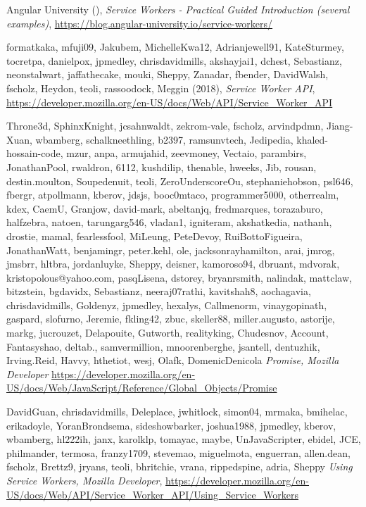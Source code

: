 \documentclass[11pt ,a4paper , twoside , openright ]{article}
\begin{document}
\begin{thebibliography}{99}
	\bibitem{}
	Angular University (),
	\emph{Service Workers - Practical Guided Introduction (several examples)},
	\url{https://blog.angular-university.io/service-workers/}
	
	\bibitem{}
	formatkaka, mfuji09, Jakubem, MichelleKwa12, Adrianjewell91, KateSturmey, tocretpa, danielpox, jpmedley, chrisdavidmills, akshayjai1, dchest, Sebastianz, neonstalwart, jaffathecake, mouki, Sheppy, Zanadar, fbender, DavidWalsh, fscholz, Heydon, teoli, rassoodock, Meggin (2018),
	\emph{Service Worker API},
	\url{https://developer.mozilla.org/en-US/docs/Web/API/Service_Worker_API}
	
	\bibitem{}
	Throne3d, SphinxKnight, jcsahnwaldt, zekrom-vale, fscholz, arvindpdmn, Jiang-Xuan, wbamberg, schalkneethling, b2397, ramsunvtech, Jedipedia, khaled-hossain-code, mzur, anpa, armujahid, zeevmoney, Vectaio, parambirs, JonathanPool, rwaldron, 6112, kushdilip, thenable, hweeks, Jib, rousan, destin.moulton, Soupedenuit, teoli, ZeroUnderscoreOu, stephaniehobson, psl646, fbergr, atpollmann, kberov, jdsjs, booc0mtaco, programmer5000, otherrealm, kdex, CaemU, Granjow, david-mark, abeltanjq, fredmarques, torazaburo, halfzebra, natoen, tarungarg546, vladan1, igniteram, akshatkedia, nathanh, drostie, mamal, fearlessfool, MiLeung, PeteDevoy, RuiBottoFigueira, JonathanWatt, benjamingr, peter.kehl, ole, jacksonrayhamilton, arai, jmrog, jmsbrr, hltbra, jordanluyke, Sheppy, deisner, kamoroso94, dbruant, mdvorak, kristopolous@yahoo.com, pasqLisena, dstorey, bryanrsmith, nalindak, mattclaw, bitzstein, bgdavidx, Sebastianz, neeraj07rathi, kavitshah8, aochagavia, chrisdavidmills, Goldenyz, jpmedley, hexalys, Callmenorm, vinaygopinath, gaspard, slofurno, Jeremie, fkling42, zbuc, skeller88, miller.augusto, astorije, markg, jucrouzet, Delapouite, Gutworth, realityking, Chudesnov, Account, Fantasyshao, deltab., samvermillion, mnoorenberghe, jsantell, dentuzhik, Irving.Reid, Havvy, hthetiot, wesj, Olafk, DomenicDenicola
	\emph{Promise, Mozilla Developer}
	\url{https://developer.mozilla.org/en-US/docs/Web/JavaScript/Reference/Global_Objects/Promise}
	
	\bibitem{}
	DavidGuan, chrisdavidmills, Deleplace, jwhitlock, simon04, mrmaka, bmihelac, erikadoyle, YoranBrondsema, sideshowbarker, joshua1988, jpmedley, kberov, wbamberg, hl222ih, janx, karolklp, tomayac, maybe, UnJavaScripter, ebidel, JCE, philmander, termosa, franzy1709, stevemao, miguelmota, enguerran, allen.dean, fscholz, Brettz9, jryans, teoli, bhritchie, vrana, rippedspine, adria, Sheppy
	\emph{Using Service Workers, Mozilla Developer},
	\url{https://developer.mozilla.org/en-US/docs/Web/API/Service_Worker_API/Using_Service_Workers}
	

\end{thebibliography}
\end{document}
